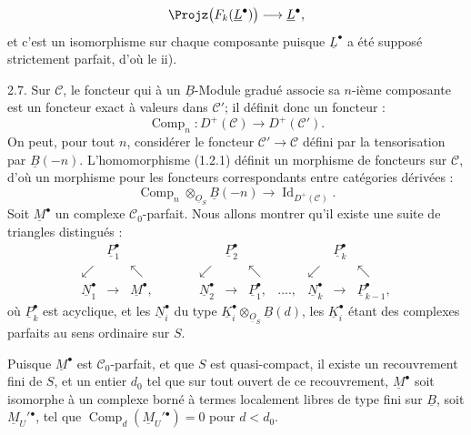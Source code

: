 
\[
  \Projz\bigl(F_k(\underline{L}^{\bullet})\bigr)\longrightarrow \underline{L}^{\bullet},
\]
et c'est un
isomorphisme sur chaque composante puisque $\underline{L}^{\bullet}$ a été supposé strictement parfait, d'où le ii).

2.7. Sur $\mathcal C$, le foncteur qui à un $\underline{B}$-Module gradué associe sa $n$-ième composante est un foncteur exact à valeurs dans $\mathcal C'$; il définit donc un foncteur :
\begin{equation}\tag{2.7.1}
  \operatorname{Comp}_n:D^+(\mathcal C)\longrightarrow D^+(\mathcal C').
\end{equation}
On peut, pour tout $n$, considérer le foncteur $\mathcal C'\to\mathcal C$ défini par la tensorisation par $\underline{B}(-n)$. L'homomorphisme (1.2.1) définit un morphisme de foncteurs sur $\mathcal C$, d'où un morphisme pour les foncteurs correspondants entre catégories dérivées :
\begin{equation}\tag{2.7.2}
  \operatorname{Comp}_n\otimes_{\underline{O}_S} \underline{B}(-n)
  \longrightarrow \operatorname{Id}_{D^+(\mathcal C)}.
\end{equation}
Soit $\underline{M}^{\bullet}$ un complexe $\mathcal C_0$-parfait. Nous allons montrer qu'il existe une suite de triangles distingués :
\[
\begin{array}{ccccccccccc}
& \underline{P}_1^{\bullet} &&&& \underline{P}_2^{\bullet} &&&& \underline{P}_k^{\bullet} & \\
\swarrow && \nwarrow && \swarrow && \nwarrow && \swarrow && \nwarrow \\
\underline{N}_1^{\bullet} & \longrightarrow & \underline{M}^{\bullet}, & \qquad &
\underline{N}_2^{\bullet} & \longrightarrow & \underline{P}_1^{\bullet}, & ...., &
\underline{N}_k^{\bullet} & \longrightarrow & \underline{P}_{k-1}^{\bullet},
\end{array}
\]
où $\underline{P}_k^{\bullet}$ est acyclique, et les $\underline{N}_i^{\bullet}$ du type \(\underline{K}_i^{\bullet}\otimes_{\underline{O}_S}\underline{B}(d)\), les $\underline{K}_i^{\bullet}$ étant des complexes parfaits au sens ordinaire sur $S$.

Puisque $\underline{M}^{\bullet}$ est $\mathcal C_0$-parfait, et que $S$ est quasi-compact, il existe un recouvrement fini de $S$, et un entier $d_0$ tel que sur tout ouvert de ce recouvrement, $\underline{M}^{\bullet}$ soit isomorphe à un complexe borné à termes localement libres de type fini sur $\underline{B}$, soit $\underline{M}_U'{}^{\bullet}$, tel que $\operatorname{Comp}_d(\underline{M}_U'{}^{\bullet})=0$ pour $d<d_0$.


